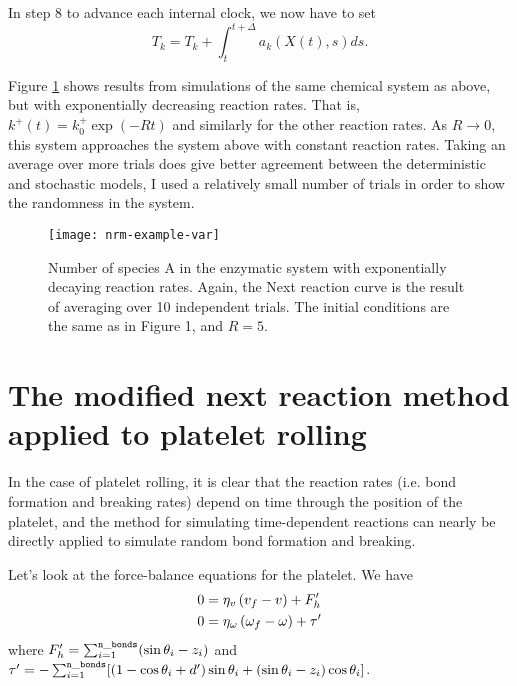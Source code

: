 \documentclass{article}
\begin{document}
In step 8 to advance each internal clock, we now have to set
\begin{equation}
  \label{eq:step-8}
  T_k = T_k + \int_t^{t + \Delta} a_k(X(t), s) ds.
\end{equation}

Figure \ref{fig:nrm-example-var} shows results from simulations of the
same chemical system as above, but with exponentially decreasing
reaction rates. That is, $k^+(t) = k^+_0 \exp(-Rt)$ and similarly for
the other reaction rates. As $R \rightarrow 0$, this system approaches
the system above with constant reaction rates. Taking an average over
more trials does give better agreement between the deterministic and
stochastic models, I used a relatively small number of trials in order
to show the randomness in the system.

\begin{figure}
  \centering
  \texttt{[image: nrm-example-var]}
  \caption{Number of species A in the enzymatic system with
    exponentially decaying reaction rates. Again, the Next reaction
    curve is the result of averaging over 10 independent trials. The
    initial conditions are the same as in Figure 1, and $R = 5$.}
  \label{fig:nrm-example-var}
\end{figure}

\section{The modified next reaction method applied to platelet
  rolling}
\label{sec:plt-rolling}

In the case of platelet rolling, it is clear that the reaction rates
(i.e. bond formation and breaking rates) depend on time through the
position of the platelet, and the method for simulating time-dependent
reactions can nearly be directly applied to simulate random bond
formation and breaking.

Let's look at the force-balance equations for the platelet. We have
\begin{align}
  \label{eq:vel-force-bal}
  0 &= \eta_v \left(v_f - v \right) +
      F_h' \\
  \label{eq:rot-force-bal}
  0 &= \eta_\omega \left(\omega_f - \omega \right) +
      \tau'
\end{align}
where $F_h' = \sum_{i=1}^\mathtt{n\_bonds}
(\sin\theta_i - z_i )$ and $\tau' =
-\sum_{i=1}^\mathtt{n\_bonds} [(1 - \cos\theta_i +
d')\sin\theta_i + (\sin\theta_i -
z_i)\cos\theta_i]$.
\end{document}
